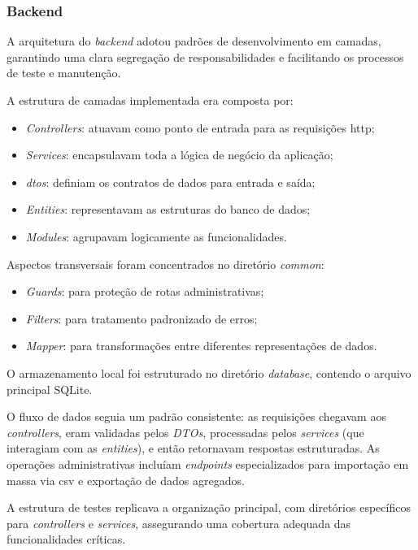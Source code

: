 \subsubsection{Backend}
  A arquitetura do \textit{backend} adotou padrões de desenvolvimento em camadas, garantindo uma clara segregação de responsabilidades e facilitando os processos de teste e manutenção.

  A estrutura de camadas implementada era composta por:
\begin{itemize}
    \item \textit{Controllers}: atuavam como ponto de entrada para as requisições \ac{http};
    \item \textit{Services}: encapsulavam toda a lógica de negócio da aplicação;
    \item \textit{\acp{dto}}: definiam os contratos de dados para entrada e saída;
    \item \textit{Entities}: representavam as estruturas do banco de dados;
    \item \textit{Modules}: agrupavam logicamente as funcionalidades.
\end{itemize}

  Aspectos transversais foram concentrados no diretório \textit{common}:
\begin{itemize}
    \item \textit{Guards}: para proteção de rotas administrativas;
    \item \textit{Filters}: para tratamento padronizado de erros;
    \item \textit{Mapper}: para transformações entre diferentes representações de dados.
\end{itemize}

  O armazenamento local foi estruturado no diretório \textit{database}, contendo o arquivo principal SQLite.

  O fluxo de dados seguia um padrão consistente: as requisições chegavam aos \textit{controllers}, eram validadas pelos \textit{DTOs}, processadas pelos \textit{services} (que interagiam com as \textit{entities}), e então retornavam respostas estruturadas. As operações administrativas incluíam \textit{endpoints} especializados para importação em massa via \ac{csv} e exportação de dados agregados.

  A estrutura de testes replicava a organização principal, com diretórios específicos para \textit{controllers} e \textit{services}, assegurando uma cobertura adequada das funcionalidades críticas.

